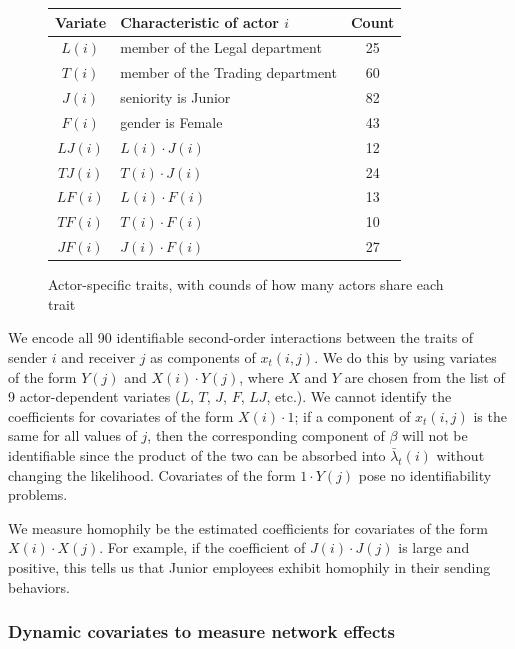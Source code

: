 \documentclass[final]{statsoc}
\begin{document}
\begin{figure}
\centering
\begin{tabular}{clc}
\toprule
Variate & Characteristic of actor $i$ & Count\\
\midrule
$L(i)$ & member of the Legal department   & 25 \\
$T(i)$ & member of the Trading department & 60 \\
$J(i)$ & seniority is Junior              & 82 \\
$F(i)$ & gender is Female                 & 43 \\
$LJ(i)$ & $L(i) \cdot J(i)$               & 12 \\
$TJ(i)$ & $T(i) \cdot J(i)$               & 24 \\
$LF(i)$ & $L(i) \cdot F(i)$               & 13 \\
$TF(i)$ & $T(i) \cdot F(i)$               & 10 \\
$JF(i)$ & $J(i) \cdot F(i)$               & 27 \\
\bottomrule
\end{tabular}
\caption{
  Actor-specific traits, with counds of how many actors share each trait
}
\label{F:enron-actors}
\end{figure}

We encode all 90 identifiable second-order interactions between the traits of
sender $i$ and receiver $j$ as components of $x_t(i,j)$.  We do this by using
variates of the form $Y(j)$ and $X(i)\cdot Y(j)$, where $X$ and $Y$ are chosen
from the list of 9 actor-dependent variates ($L$, $T$, $J$, $F$, $LJ$, etc.).
We cannot identify the coefficients for covariates of the form $X(i) \cdot 1$;
if a component of $x_t(i,j)$ is the same for all values of $j$, then the
corresponding component of $\beta$ will not be identifiable since the product
of the two can be absorbed into $\bar \lambda_t(i)$ without changing the
likelihood.  Covariates of the form $1 \cdot Y(j)$ pose no identifiability
problems.

We measure homophily be the estimated coefficients for covariates of the form
$X(i) \cdot X(j)$.  For example, if the coefficient of $J(i) \cdot J(j)$ is
large and positive, this tells us that Junior employees exhibit homophily in
their sending behaviors.


\subsubsection{Dynamic covariates to measure network effects}
\end{document}
